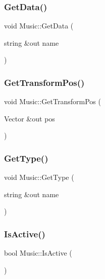 \hypertarget{class_music_a06d06ae121cbaea733ae7f0dcff8052d}{}\label{class_music_a06d06ae121cbaea733ae7f0dcff8052d} 
\subsubsection{\texorpdfstring{Get\+Data()}{GetData()}}
{\footnotesize\ttfamily void Music\+::\+Get\+Data (\begin{DoxyParamCaption}\item[{string \&out}]{name }\end{DoxyParamCaption})}

\hypertarget{class_music_a30722cdb3ace99a39b73369b24a6346e}{}\label{class_music_a30722cdb3ace99a39b73369b24a6346e} 
\subsubsection{\texorpdfstring{Get\+Transform\+Pos()}{GetTransformPos()}}
{\footnotesize\ttfamily void Music\+::\+Get\+Transform\+Pos (\begin{DoxyParamCaption}\item[{Vector \&out}]{pos }\end{DoxyParamCaption})}

\hypertarget{class_music_a0f87a2494872304af8b73690c3e28a15}{}\label{class_music_a0f87a2494872304af8b73690c3e28a15} 
\subsubsection{\texorpdfstring{Get\+Type()}{GetType()}}
{\footnotesize\ttfamily void Music\+::\+Get\+Type (\begin{DoxyParamCaption}\item[{string \&out}]{name }\end{DoxyParamCaption})}

\hypertarget{class_music_a7d9f11b35101c07fb38cc49efc4e1e16}{}\label{class_music_a7d9f11b35101c07fb38cc49efc4e1e16} 
\subsubsection{\texorpdfstring{Is\+Active()}{IsActive()}}
{\footnotesize\ttfamily bool Music\+::\+Is\+Active (\begin{DoxyParamCaption}{ }\end{DoxyParamCaption})}

